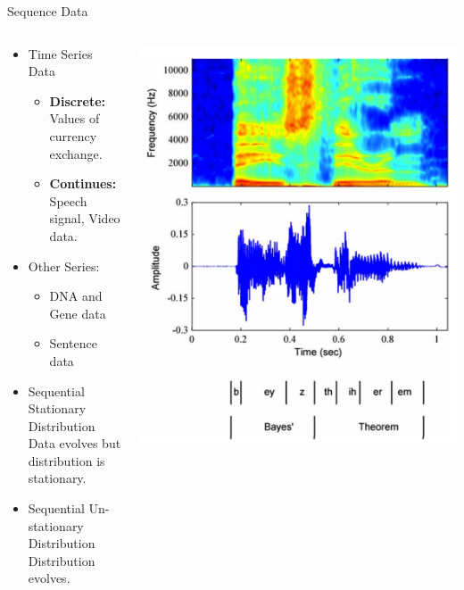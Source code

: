 \documentclass{beamer}
\begin{document}
	\begin{frame}{Sequence Data}
		\begin{columns}
			\begin{column}{0.6\textwidth}
				\begin{itemize}
					\item<1-> Time Series Data\begin{itemize}
						\item \textbf{Discrete:} Values of currency exchange.
						\item \textbf{Continues:} Speech signal, Video data.
					\end{itemize}
					\item<2-> Other Series:\begin{itemize}
						\item DNA and Gene data
						\item Sentence data
					\end{itemize}
				\end{itemize}
			\begin{itemize}
				\item <3-> Sequential Stationary Distribution \\ \tiny Data evolves but distribution is stationary. \normalsize
				\item <4-> Sequential Un-stationary Distribution \\ \tiny Distribution evolves.
			\end{itemize}
			\end{column}
			\begin{column}{0.4\textwidth}
				\includegraphics[scale=0.2]{pics/sequencedata.png}

\end{column}
\end{columns}
\end{frame}
\end{document}

